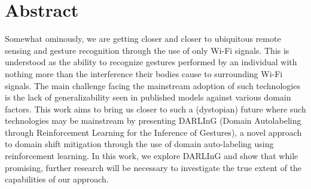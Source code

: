 \chapter*{Abstract}\label{chapter:abstract}

Somewhat ominously, we are getting closer and closer to ubiquitous remote sensing and gesture recognition through the use of only Wi-Fi signals.
This is understood as the ability to recognize gestures performed by an individual with nothing more than the interference their bodies cause to surrounding Wi-Fi signals.
The main challenge facing the mainstream adoption of such technologies is the lack of generalizability seen in published models against various domain factors.
This work aims to bring us closer to such a (dystopian) future where such technologies may be mainstream by presenting DARLInG (Domain Autolabeling through Reinforcement Learning for the Inference of Gestures), a novel approach to domain shift mitigation through the use of domain auto-labeling using reinforcement learning.
In this work, we explore DARLInG and show that while promising, further research will be necessary to investigate the true extent of the capabilities of our approach.